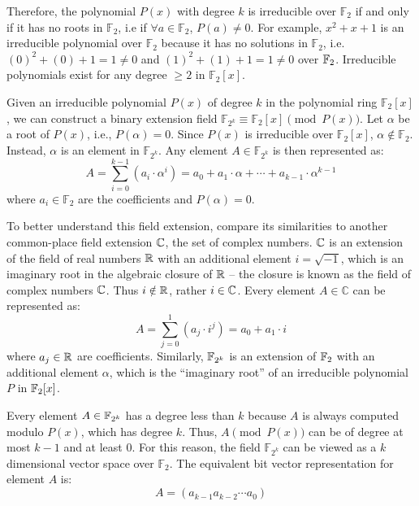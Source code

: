 Therefore, the polynomial $P(x)$ with degree $k$ is irreducible over 
$\mathbb{F}_{2}$ if and only if it has no roots in $\mathbb{F}_{2}$,
i.e if $\forall a \in \mathbb{F}_{2}$, $P(a)\neq 0$.
For example, $x^2+x+1$ is an irreducible polynomial over $\mathbb{F}_{2}$
because it has no solutions in $\mathbb{F}_{2}$, i.e. $(0)^2+(0)+1=1\neq0$ 
and $(1)^2+(1)+1=1\neq0$ over ${\mathbb{F}}_2$.
Irreducible polynomials exist for any degree $\geq 2$ in $\mathbb{F}_2[x]$.

Given an irreducible polynomial $P(x)$ of degree $k$ in the polynomial ring 
$\mathbb{F}_2[x]$, we can construct a binary extension field 
$\mathbb{F}_{2^k} \equiv \mathbb{F}_2[x] \pmod{P(x)}$.
Let $\alpha$ be a root of $P(x)$, i.e., $P(\alpha)=0$.
Since $P(x)$ is irreducible over
$\mathbb{F}_2[x]$, $\alpha \notin \mathbb{F}_2$. 
Instead, $\alpha$ is an element in $\mathbb{F}_{2^k}$. 
Any element $A \in \mathbb{F}_{2^k}$ is then represented as: 
\begin{equation}\label{rep:poly}
A= \sum_{i=0}^{k-1} (a_i \cdot \alpha^i) = a_0 + a_1\cdot\alpha + \cdots + a_{k-1}\cdot \alpha^{k-1}\nonumber
\end{equation}
where $a_i \in \mathbb{F}_2$ are the coefficients and $P(\alpha)=0$.

To better understand this field extension, compare its similarities to another
common-place
field extension ${\mathbb{C}}$, the set of complex numbers. ${\mathbb{C}}$ is an extension of the field 
of real numbers ${\mathbb{R}}$ with an additional element $i=\sqrt{-1}$, which is an imaginary
root in the algebraic closure of ${\mathbb{R}}$ -- the closure is known as the field of complex numbers ${\mathbb{C}}$.
Thus $i \notin {\mathbb{R}}$, rather $i \in {\mathbb{C}}$.
Every element $A \in \mathbb{C}$ can be represented as:
\begin{equation}\label{rep:polyC}
A=\sum_{j=0}^{1} (a_j \cdot i^j)=a_0+a_1\cdot i
\end{equation}
where $a_j \in {\mathbb{R}}$ are coefficients. Similarly, ${\mathbb{F}}_{2^k}$ is an extension of ${\mathbb{F}}_2$ with 
an additional element $\alpha$, which is the ``imaginary root'' of an irreducible 
polynomial $P$ in ${\mathbb{F}}_2[x]$.

Every element $A \in {\mathbb{F}}_{2^k}$ has a degree less than $k$ because 
$A$ is always computed modulo $P(x)$, which has degree $k$. 
Thus, $A\pmod {P(x)}$ can be of degree at most $k-1$ and at least $0$.
For this reason, the field $\mathbb{F}_{2^k}$ can be viewed as a $k$
dimensional vector space over $\mathbb{F}_{2}$. 
The equivalent bit vector representation for element $A$ is:
\begin{equation}
A=(a_{k-1} a_{k-2} \cdots a_{0})
\end{equation}

